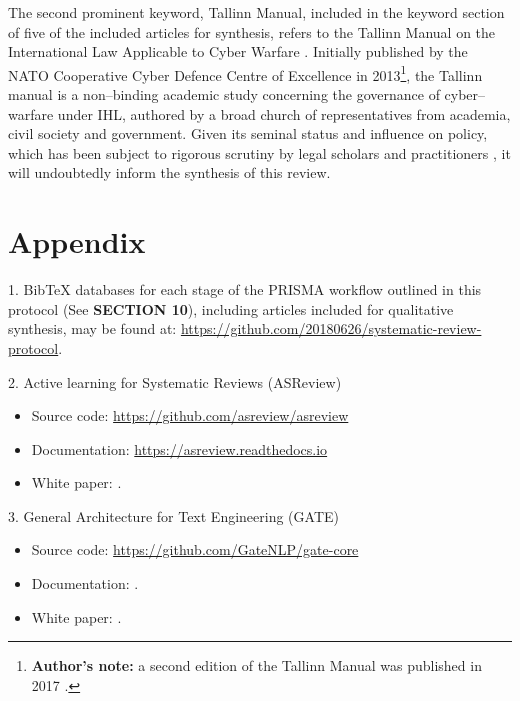 \documentclass[british]{article}
\begin{document}
The second prominent keyword, \textquotedbl Tallinn Manual\textquotedbl ,
included in the keyword section of five of the included articles for
synthesis, refers to the Tallinn Manual on the International Law Applicable
to Cyber Warfare \cite{schmitt2013tallinn}. Initially published by
the NATO Cooperative Cyber Defence Centre of Excellence in 2013\footnote{\textbf{Author's note:} a second edition of the Tallinn Manual was
published in 2017 \cite{schmitt2017tallinn}.}, the Tallinn manual is a non--binding academic study concerning
the governance of cyber--warfare under IHL, authored by a broad church
of representatives from academia, civil society and government. Given
its seminal status and influence on policy, which has been subject
to rigorous scrutiny by legal scholars and practitioners \cite{kessler2013expertise,fleck2013searching,von2012tallinn},
it will undoubtedly inform the synthesis of this review.\newpage{}

\section*{Appendix}

1. BibTeX databases for each stage of the PRISMA workflow outlined
in this protocol (See \textbf{SECTION 10}), including articles included
for qualitative synthesis, may be found at: \url{https://github.com/20180626/systematic-review-protocol}.

2. Active learning for Systematic Reviews (ASReview) 
\begin{itemize}
\item Source code: \url{https://github.com/asreview/asreview} 
\item Documentation: \url{https://asreview.readthedocs.io} 
\item White paper: .
\end{itemize}
3. General Architecture for Text Engineering (GATE) 
\begin{itemize}
\item Source code: \url{https://github.com/GateNLP/gate-core} 
\item Documentation: . 
\item White paper: .
\end{itemize}
\newpage{}

\printbibliography
\end{document}
